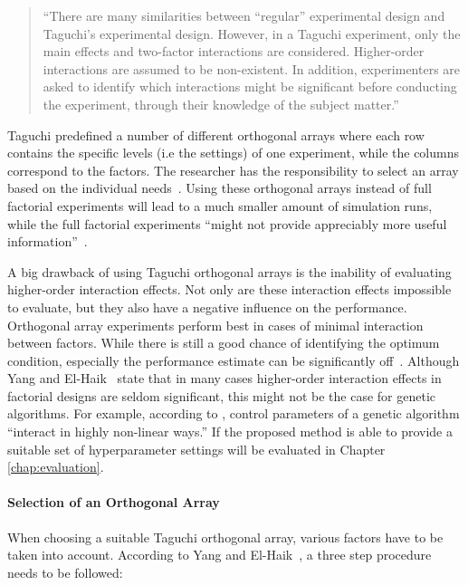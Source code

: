 \begin{quote}
	\begin{em}
		\enquote{There are many similarities between “regular” experimental design and Taguchi's experimental design. However, in a Taguchi experiment, only the main effects and two-factor interactions are considered. Higher-order interactions are assumed to be non-existent. In addition, experimenters are asked to identify which interactions might be significant before conducting the experiment, through their knowledge of the subject matter.}~\cite{yang_design_2009}
	\end{em}
\end{quote}

Taguchi predefined a number of different orthogonal arrays where each row contains the specific levels (i.e the settings) of one experiment, while the columns correspond to the factors. The researcher has the responsibility to select an array based on the individual needs~\cite{li_taguchi_2021}. Using these orthogonal arrays instead of full factorial experiments will lead to a much smaller amount of simulation runs, while the full factorial experiments \enquote{might not provide appreciably more useful information}~\cite{roy_primer_1990}.

A big drawback of using Taguchi orthogonal arrays is the inability of evaluating higher-order interaction effects. Not only are these interaction effects impossible to evaluate, but they also have a negative influence on the performance. Orthogonal array experiments perform best in cases of minimal interaction between factors. While there is still a good chance of identifying the optimum condition, especially the performance estimate can be significantly off~\cite{roy_primer_1990}. Although Yang and El-Haik~\cite{yang_design_2009} state that in many cases higher-order interaction effects in factorial designs are seldom significant, this might not be the case for genetic algorithms. For example, according to \cite{kacprzyk_parameter_2007}, control parameters of a genetic algorithm \enquote{interact in highly non-linear ways.} If the proposed method is able to provide a suitable set of hyperparameter settings will be evaluated in Chapter \ref{chap:evaluation}.

\paragraph{Selection of an Orthogonal Array}
When choosing a suitable Taguchi orthogonal array, various factors have to be taken into account. According to Yang and El-Haik~\cite{yang_design_2009}, a three step procedure needs to be followed:

